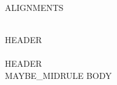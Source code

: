 \begin{center}
\begin{longtable}{{ALIGNMENTS}}
\caption{{CAPTION}\label{{LABEL}}}\\
\toprule
{HEADER}\\
\midrule
\endfirsthead
{}\\
\toprule
{HEADER}\\
\midrule
\endhead
{MAYBE_MIDRULE}
\endfoot
\bottomrule
\endlastfoot
{BODY}
\end{longtable}
\end{center}
